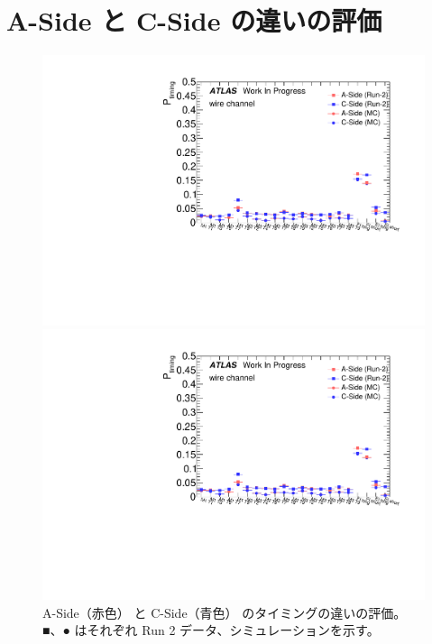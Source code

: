 \section{A-Side と C-Side の違いの評価}
\begin{figure}[H]
	\begin{minipage}{0.49\hsize}
	\centering
	\includegraphics[width=\textwidth,page=1]{img/pdf5/master_ACcomp.pdf}
	\end{minipage}
	\begin{minipage}{0.49\hsize}
	\centering
	\includegraphics[width=\textwidth,page=2]{img/pdf5/master_ACcomp.pdf}
	\end{minipage}
	\caption[A-Side と C-Side のタイミングの違いの評価]{A-Side（赤色） と C-Side（青色） のタイミングの違いの評価。■、● はそれぞれ Run 2 データ、シミュレーションを示す。}
	\label{fig:timingPlotAC}
\end{figure}
